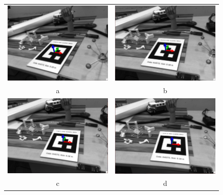 \begin{figure}[H]
\centering
\begin{tabular}{cc}
  \includegraphics[width=65mm]{figures/sample_0} &   \includegraphics[width=65mm]{figures/sample_1}  \\
  a & b \\[6pt]
  \includegraphics[width=65mm]{figures/sample_2} &   \includegraphics[width=65mm]{figures/sample_3} \\
  c & d \\[6pt]

\end{tabular}
\end{figure}

